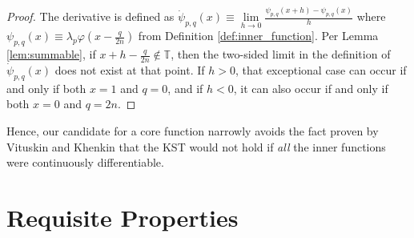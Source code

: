 \begin{proof}
  The derivative is defined as $\dot{\psi}_{p,q}\left(x\right) \equiv \lim\limits_{h \rightarrow 0} \frac{\psi_{p,q}\left(x + h\right) - \psi_{p,q}\left(x\right)}{h}$ where $\psi_{p,q}\left(x\right) \equiv \lambda_p \varphi\left(x - \frac{q}{2n}\right)$ from Definition \ref{def:inner_function}. Per Lemma \ref{lem:summable}, if $x + h - \frac{q}{2n} \notin \mathbb{T}$, then the two-sided limit in the definition of $\dot{\psi}_{p,q}\left(x\right)$ does not exist at that point. If $h > 0$, that exceptional case can occur if and only if both $x = 1$ and $q = 0$, and if $h < 0$, it can also occur if and only if both $x = 0$ and $q = 2n$.
\end{proof}
\begin{remark*}
Hence, our candidate for a core function narrowly avoids the fact proven by Vituskin and Khenkin that the KST would not hold if \emph{all} the inner functions were continuously differentiable.     
\end{remark*}

\section{Requisite Properties}\label{sec:RequisiteProperties}

